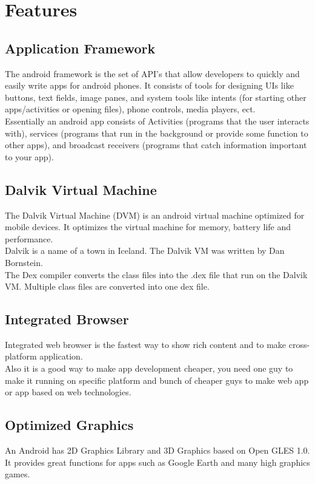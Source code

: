 \documentclass[twoside,a4paper,16pt]{book}
\begin{document}
\section{Features}

\subsection{Application Framework}
The android framework is the set of API's that allow developers to quickly and easily write apps for android phones. It consists of tools for designing UIs like buttons, text fields, image panes, and system tools like intents (for starting other apps/activities or opening files), phone controls, media players, ect.\\ Essentially an android app consists of Activities (programs that the user interacts with), services (programs that run in the background or provide some function to other apps), and broadcast receivers (programs that catch information important to your app). \\

\subsection{Dalvik Virtual Machine}
The Dalvik Virtual Machine (DVM) is an android virtual machine optimized for mobile devices. It optimizes the virtual machine for memory, battery life and performance.\\
Dalvik is a name of a town in Iceland. The Dalvik VM was written by Dan Bornstein.\\
The Dex compiler converts the class files into the .dex file that run on the Dalvik VM. Multiple class files are converted into one dex file.\\

\subsection{Integrated Browser}
 Integrated web browser is the fastest way to show rich content and to make cross-platform application.\\ Also it is a good way to make app development cheaper, you need one guy to make it running on specific platform and bunch of cheaper guys to make web app or app based on web technologies.\\

\subsection{Optimized Graphics}
An Android has 2D Graphics Library and 3D Graphics based on Open GLES 1.0. It provides great functions for apps such as Google Earth and many high graphics games.\\
\end{document}
